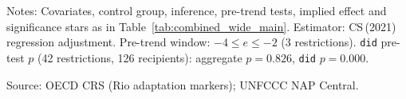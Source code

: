 \begin{table}[H]
\centering
\caption{Placebo test: treatment date assigned 2 years before actual NAP adoption}
\label{tab:placebo}
\begingroup\small
{}
\endgroup
\par\vspace{4pt}
\begin{minipage}{\linewidth}\footnotesize
Notes: Covariates, control group, inference, pre-trend tests, implied effect and significance stars as in Table~\ref{tab:combined_wide_main}. Estimator: CS\,(2021) regression adjustment. Pre-trend window: $-4 \leq e \leq -2$ (3 restrictions). \texttt{did} pre-test $p$ (42 restrictions, 126 recipients): aggregate $p = 0.826$, \texttt{did} $p = 0.000$.\par
Source: OECD CRS (Rio adaptation markers); UNFCCC NAP Central.
\end{minipage}
\end{table}
